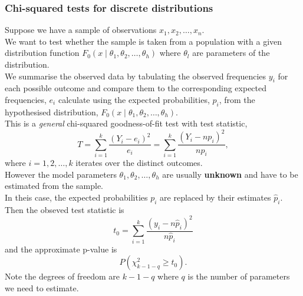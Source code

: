 \documentclass[a4paper]{article}
\begin{document}
\subsubsection{Chi-squared tests for discrete distributions}
Suppose we have a sample of observations \( x_1,x_2,\dotsc,x_n \).\\
We want to test whether the sample is taken from a population with a given distribution function \( F_0 (x \mid \theta_1, \theta_2, \dotsc, \theta_h) \) where \( \theta_l \) are parameters of the distribution.\\
We summarise the observed data by tabulating the observed frequencies \( y_i \) for each possible outcome and compare them to the corresponding expected frequencies, \( e_i \) calculate using the expected probabilities, \( p_i \), from the hypothesised distribution, \( F_0 (x \mid \theta_1, \theta_2, \dotsc, \theta_h) \).\\
This is a \textit{general} chi-squared goodness-of-fit test with test statistic,
\[
	T = \sum_{i=1}^{k} \frac{(Y_i - e_i)^2}{e_i} = \sum_{i=1}^{k}\frac{(Y_i - np_i)^2}{np_i},
\]
where \( i = 1,2,\dotsc,k \) iterates over the distinct outcomes.\\
However the model parameters \( \theta_1, \theta_2,\dotsc,\theta_h \) are usually \textbf{unknown} and have to be estimated from the sample.\\
In theis case, the expected probabilities \( p_i \) are replaced by their estimates \( \hat{p}_i \).\\
Then the obseved test statistic is
\[
	t_0 = \sum_{i=1}^{k} \frac{(y_i - n\hat{p}_i)^2}{n \hat{p}_i}
\]
and the approximate p-value is
\[
	P(\chi^2_{k-1-q} \geq t_0).
\]
Note the degrees of freedom are \( k-1-q \) where \( q \) is the number of parameters we need to estimate.
\end{document}
